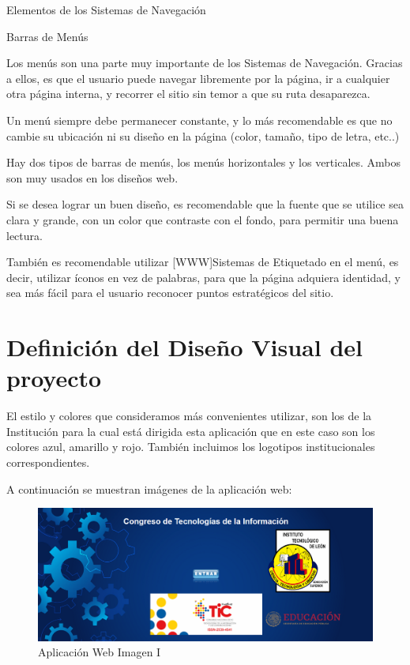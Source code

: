 Elementos de los Sistemas de Navegación

Barras de Menús

Los menús son una parte muy importante de los Sistemas de Navegación. Gracias a ellos, es que el usuario puede navegar libremente por la página, ir a cualquier otra página interna, y recorrer el sitio sin temor a que su ruta desaparezca.

Un menú siempre debe permanecer constante, y lo más recomendable es que no cambie su ubicación ni su diseño en la página (color, tamaño, tipo de letra, etc..)

Hay dos tipos de barras de menús, los menús horizontales y los verticales. Ambos son muy usados en los diseños web. 

Si se desea lograr un buen diseño, es recomendable que la fuente que se utilice sea clara y grande, con un color que contraste con el fondo, para permitir una buena lectura. 

También es recomendable utilizar [WWW]Sistemas de Etiquetado en el menú, es decir, utilizar íconos en vez de palabras, para que la página adquiera identidad, y sea más fácil para el usuario reconocer puntos estratégicos del sitio.


\section{Definición del Diseño Visual del proyecto}
El estilo y colores que consideramos más convenientes utilizar, son los de la Institución para la cual está dirigida esta aplicación que en este caso son los colores azul, amarillo y rojo. También incluimos los logotipos institucionales correspondientes.

A continuación se muestran imágenes de la aplicación web:


\begin{figure}[H]
	\centering
	\includegraphics[width=1\linewidth]{Imagenes/web1}
	\caption{Aplicación Web Imagen I}
	\label{fig:web1}
\end{figure}

